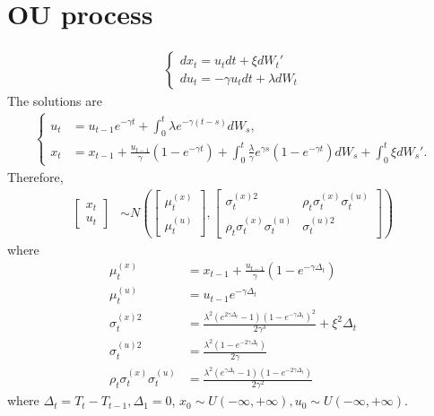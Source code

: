
\section{OU process}
\begin{align}
\begin{cases}
dx_t = u_t dt+\xi dW_t'\\
du_t = -\gamma u_t dt+ \lambda dW_t
\end{cases}
\end{align}
The solutions are
\begin{align}
\begin{cases}
u_t &=u_{t-1}e^{-\gamma t} +\int_{0}^{t} \lambda e^{-\gamma (t-s)}dW_s,\\
x_t &=x_{t-1} +\frac{u_{t-1}}{\gamma}(1- e^{-\gamma t}) + \int_{0}^{t} \frac{\lambda}{\gamma}e^{\gamma  s} \left(1-e^{-\gamma t}\right)dW_s + \int_{0}^{t}\xi dW_s'.
\end{cases}
\end{align}
Therefore,
\begin{align*}
\begin{bmatrix} x_t \\ u_t \end{bmatrix} &\sim N\left(
\begin{bmatrix}\mu_t^{(x)} \\ \mu_t^{(u)}  \end{bmatrix} , 
\begin{bmatrix}
\sigma_t^{(x)2} & \rho_t\sigma_t^{(x)} \sigma_t^{(u)} \\
\rho_t\sigma_t^{(x)} \sigma_t^{(u)} & \sigma_t^{(u)2}
\end{bmatrix} \right)
\end{align*}
where
\begin{align*}
\mu_t^{(x)} &= x_{t-1} +\frac{u_{t-1}}{\gamma}(1- e^{-\gamma \Delta_t}) \\
\mu_t^{(u)} &= u_{t-1}e^{-\gamma  \Delta_t}\\
\sigma_t^{(x)2} &=\frac{\lambda^2 \left(e^{2 \gamma\Delta_t}-1\right) \left(1 -e^{-\gamma\Delta_t}\right)^2}{2 \gamma ^3 } + \xi^2\Delta_t\\
\sigma_t^{(u)2} &= \frac{\lambda ^2 \left(1- e^{-2 \gamma\Delta_t}\right)}{2 \gamma } \\
\rho_t\sigma_t^{(x)}\sigma_t^{(u)} & =\frac{\lambda ^2 \left(e^{\gamma\Delta_t} -1\right) \left(1-e^{-2\gamma\Delta_t}\right)}{2 \gamma ^2}
\end{align*}
where $\Delta_t = T_t-T_{t-1}, \Delta_1=0$, $x_0\sim U(-\infty,+\infty), u_0\sim U(-\infty,+\infty)$.

